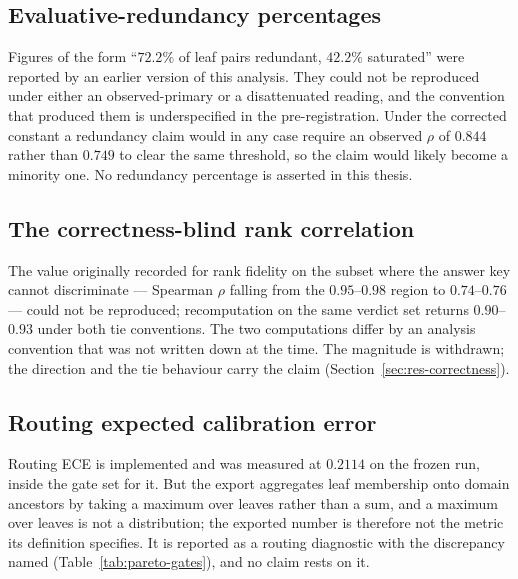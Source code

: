 \subsection*{Evaluative-redundancy percentages}

Figures of the form ``$72.2\%$ of leaf pairs redundant, $42.2\%$
saturated'' were reported by an earlier version of this analysis. They
could not be reproduced under either an observed-primary or a
disattenuated reading, and the convention that produced them is
underspecified in the pre-registration. Under the corrected constant a
redundancy claim would in any case require an observed $\rho$ of
$0.844$ rather than $0.749$ to clear the same threshold, so the claim
would likely become a minority one. No redundancy percentage is
asserted in this thesis.

\subsection*{The correctness-blind rank correlation}

The value originally recorded for rank fidelity on the subset where
the answer key cannot discriminate --- Spearman $\rho$ falling from
the $0.95$--$0.98$ region to $0.74$--$0.76$ --- could not be
reproduced; recomputation on the same verdict set returns
$0.90$--$0.93$ under both tie conventions. The two computations differ
by an analysis convention that was not written down at the time. The
magnitude is withdrawn; the direction and the tie behaviour carry the
claim (Section~\ref{sec:res-correctness}).


\subsection*{Routing expected calibration error}

Routing ECE is implemented and was measured at $0.2114$ on the frozen
run, inside the gate set for it. But the export aggregates leaf
membership onto domain ancestors by taking a maximum over leaves
rather than a sum, and a maximum over leaves is not a distribution;
the exported number is therefore not the metric its definition
specifies. It is reported as a routing diagnostic with the discrepancy
named (Table~\ref{tab:pareto-gates}), and no claim rests on it.


